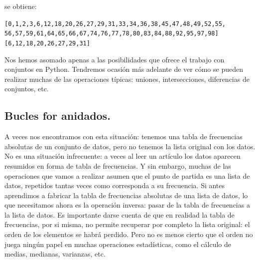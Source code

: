 \documentclass[10pt,a4paper]{article}\usepackage[]{graphicx}\usepackage[]{color}
\makeatletter
\newenvironment{kframe}{%
 \def\at@end@of@kframe{}%
 \ifinner\ifhmode%
  \def\at@end@of@kframe{\end{minipage}}%
  \begin{minipage}{\columnwidth}%
 \fi\fi%
 \def\FrameCommand##1{\hskip\@totalleftmargin \hskip-\fboxsep
 \colorbox{shadecolor}{##1}\hskip-\fboxsep
     \hskip-\linewidth \hskip-\@totalleftmargin \hskip\columnwidth}%
 \MakeFramed {\advance\hsize-\width
   \@totalleftmargin\z@ \linewidth\hsize
   \@setminipage}}%
 {\par\unskip\endMakeFramed%
 \at@end@of@kframe}
\newenvironment{knitrout}{}{} %
\newcounter {cont01}
\makeatother
\begin{document}
se obtiene:
\begin{knitrout}
\color{fgcolor}\begin{kframe}
\begin{alltt}
[0, 1, 2, 3, 6, 12, 18, 20, 26, 27, 29, 31, 33, 34, 36, 38, 45, 47, 48, 49, 52, 55,
 56, 57, 59, 61, 64, 65, 66, 67, 74, 76, 77, 78, 80, 83, 84, 88, 92, 95, 97, 98]
[6, 12, 18, 20, 26, 27, 29, 31]
\end{alltt}
\end{kframe}
\end{knitrout}
Nos hemos asomado apenas a las posibilidades que ofrece el trabajo con conjuntos en Python. Tendremos ocasión más adelante de ver cómo se pueden realizar muchas de las operaciones típicas: uniones, intersecciones, diferencias de conjuntos, etc.

\subsection{Bucles for anidados.}
\label{tut02:subsec:buclesForAnidados}

A veces nos encontramos con esta situación: tenemos una tabla de frecuencias absolutas de un conjunto de datos, pero no tenemos la lista original con los datos. No es una situación infrecuente: a veces al leer un artículo los datos aparecen resumidos en forma de tabla de frecuencias. Y sin embargo, muchas de las operaciones que vamos a realizar asumen que el punto de partida es una lista de datos, repetidos tantas veces como corresponda a su frecuencia. Si antes aprendimos a fabricar la tabla de frecuencias absolutas de una lista de datos, lo que necesitamos ahora es la operación inversa: pasar de la tabla de frecuencias a la lista de datos. Es importante darse cuenta de que en realidad la tabla de frecuencias, por si misma, no permite recuperar por completo la lista original: el orden de los elementos se habrá perdido. Pero no es menos cierto que el orden no juega ningún papel en muchas operaciones estadísticas, como el cálculo de medias, medianas, varianzas, etc.
\end{document}
